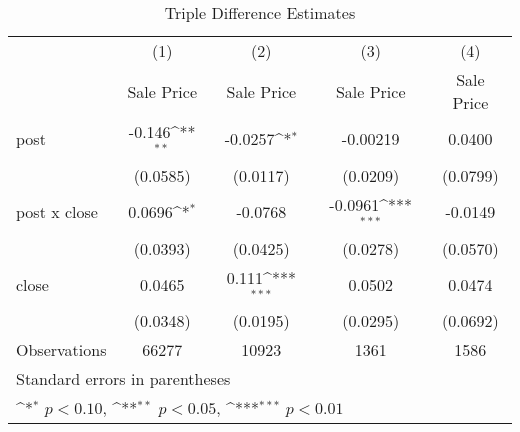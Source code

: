 \begin{table}[htbp]\centering
\def\sym#1{\ifmmode^{#1}\else\(^{#1}\)\fi}
\caption{Triple Difference Estimates\label{tabl}}
\begin{tabular}{l*{4}{c}}
\hline\hline
                    &\multicolumn{1}{c}{(1)}&\multicolumn{1}{c}{(2)}&\multicolumn{1}{c}{(3)}&\multicolumn{1}{c}{(4)}\\
                    &\multicolumn{1}{c}{Sale Price}&\multicolumn{1}{c}{Sale Price}&\multicolumn{1}{c}{Sale Price}&\multicolumn{1}{c}{Sale Price}\\
\hline
post                &      -0.146\sym{**} &     -0.0257\sym{*}  &    -0.00219         &      0.0400         \\
                    &    (0.0585)         &    (0.0117)         &    (0.0209)         &    (0.0799)         \\
[1em]
post x close        &      0.0696\sym{*}  &     -0.0768         &     -0.0961\sym{***}&     -0.0149         \\
                    &    (0.0393)         &    (0.0425)         &    (0.0278)         &    (0.0570)         \\
[1em]
close               &      0.0465         &       0.111\sym{***}&      0.0502         &      0.0474         \\
                    &    (0.0348)         &    (0.0195)         &    (0.0295)         &    (0.0692)         \\
\hline
Observations        &       66277         &       10923         &        1361         &        1586         \\
\hline\hline
\multicolumn{5}{l}{\footnotesize Standard errors in parentheses}\\
\multicolumn{5}{l}{\footnotesize \sym{*} \(p<0.10\), \sym{**} \(p<0.05\), \sym{***} \(p<0.01\)}\\
\end{tabular}
\end{table}
